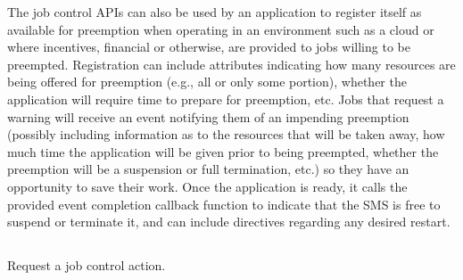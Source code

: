 The job control \acp{API} can also be used by an application to register itself as available for preemption when operating in an environment such as a cloud or where incentives, financial or otherwise, are provided to jobs willing to be preempted. Registration can include attributes indicating how many resources are being offered for preemption (e.g., all or only some portion), whether the application will require time to prepare for preemption, etc. Jobs that
request a warning will receive an event notifying them of an impending preemption (possibly including information as to the resources that will be taken away, how much time the application will be given prior to being preempted, whether the preemption will be a suspension or full termination, etc.) so they have an opportunity to save
their work. Once the application is ready, it calls the provided event completion callback function to indicate that
the SMS is free to suspend or terminate it, and can include directives regarding any desired restart.

\subsection{}

\summary

Request a job control action.

\format


\begin{arglist}
\end{arglist}

